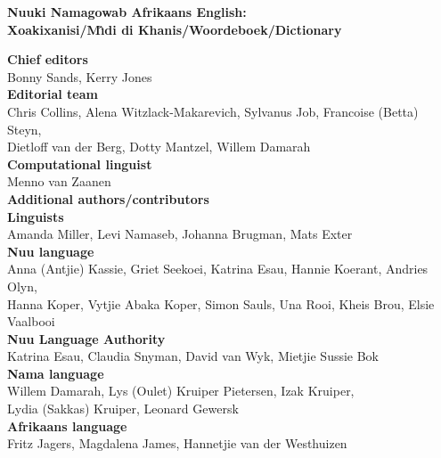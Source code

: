 \newlength{\headseptemp}
\setlength{\headseptemp}{\headsep}
\setlength{\headsep}{.5cm}
\addtolength{\textheight}{-\headsep}


\graphicspath{ {images/} }

\thispagestyle{empty}

{\center
\hfill
\vspace{2cm}

\textbf{\Large
N\textipa{\textvertline}uuki Namagowab Afrikaans English:\\
\textipa{\textdoublebarpipe}Xoaki\textipa{\textdoublebarpipe}xanisi/M\^{\i}di di \textipa{\textdoublebarpipe}Khanis/Woordeboek/Dictionary
}

\vspace{3cm}

\textbf{Chief editors}\\
Bonny Sands, Kerry Jones\\[2em]

\textbf{Editorial team}\\
Chris Collins, Alena Witzlack-Makarevich, Sylvanus Job, Francoise
(Betta) Steyn,\\
Dietloff van der Berg, Dotty Mantzel, Willem Damarah\\[2em]

\textbf{Computational linguist}\\
Menno van Zaanen\\[2em]

\textbf{Additional authors/contributors}\\[1em]

\textbf{Linguists}\\
Amanda Miller, Levi Namaseb, Johanna Brugman, Mats
Exter\\[2em]

\textbf{N\textipa{\textvertline}uu language}\\
Anna (Antjie) Kassie,
Griet Seekoei, Katrina Esau, Hannie Koerant, Andries Olyn,\\
Hanna Koper, Vytjie \textipa{\textvertline}Abaka Koper, Simon Sauls,
\textipa{\textvertline}Una Rooi, Kheis Brou, Elsie Vaalbooi\\[2em]

\textbf{N\textipa{\textvertline}uu Language Authority}\\
Katrina Esau,
Claudia Snyman, David van Wyk, Mietjie Sussie Bok\\[2em]

\textbf{Nama language}\\
Willem Damarah, Lys (Oulet) Kruiper Pietersen,
Izak Kruiper,\\
Lydia (Sakkas) Kruiper, Leonard Gewersk\\[2em]

\textbf{Afrikaans language}\\
Fritz Jagers, Magdalena James, Hannetjie
van der Westhuizen\\[2em]

} %


